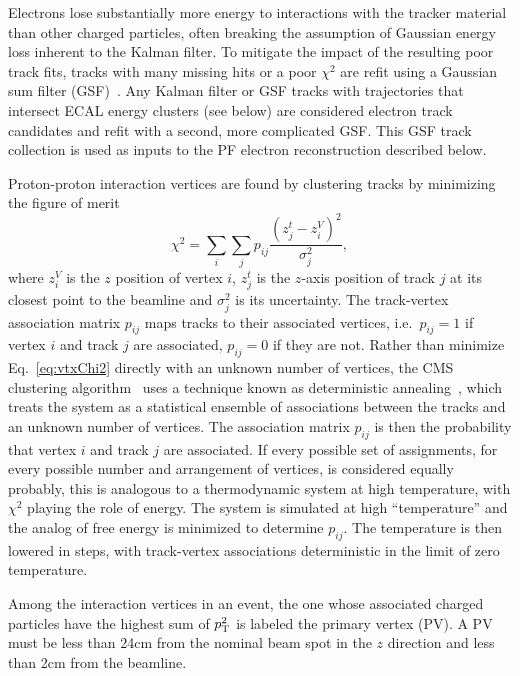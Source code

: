 Electrons lose substantially more energy to interactions with the tracker material than other charged particles, often breaking the assumption of Gaussian energy loss inherent to the Kalman filter.
To mitigate the impact of the resulting poor track fits, tracks with many missing hits or a poor $\chi^2$ are refit using a Gaussian sum filter (GSF)~\cite{Adam:2005bya}.
Any Kalman filter or GSF tracks with trajectories that intersect ECAL energy clusters (see below) are considered electron track candidates and refit with a second, more complicated GSF\@.
This GSF track collection is used as inputs to the PF electron reconstruction described below.

Proton-proton interaction vertices are found by clustering tracks by minimizing the figure of merit
\begin{equation}\label{eq:vtxChi2}
  \chi^2 = \sum_i \sum_j p_{ij} \frac{\left(z^t_j - z^V_i\right)^2}{\sigma_{j}^2},
\end{equation}
where $z^V_i$ is the $z$ position of vertex $i$, $z^t_j$ is the $z$-axis position of track $j$ at its closest point to the beamline and $\sigma_j^2$ is its uncertainty.
The track-vertex association matrix $p_{ij}$ maps tracks to their associated vertices, i.e.\ $p_{ij} = 1$ if vertex $i$ and track $j$ are associated, $p_{ij} = 0$ if they are not.
Rather than minimize Eq.~\ref{eq:vtxChi2} directly with an unknown number of vertices, the CMS clustering algorithm~\cite{Speer:2006mh,Chatrchyan:2014fea} uses a technique known as deterministic annealing~\cite{Rose:726788}, which treats the system as a statistical ensemble of associations between the tracks and an unknown number of vertices.
The association matrix $p_{ij}$ is then the probability that vertex $i$ and track $j$ are associated.
If every possible set of assignments, for every possible number and arrangement of vertices, is considered equally probably, this is analogous to a thermodynamic system at high temperature, with $\chi^2$ playing the role of energy.
The system is simulated at high ``temperature'' and the analog of free energy is minimized to determine $p_{ij}$.
The temperature is then lowered in steps, with track-vertex associations deterministic in the limit of zero temperature.

Among the interaction vertices in an event, the one whose associated charged particles have the highest sum of $p_\mathrm{T}^2$ is labeled the primary vertex (PV).
A PV must be less than 24\unit{cm} from the nominal beam spot in the $z$ direction and less than 2\unit{cm} from the beamline.



